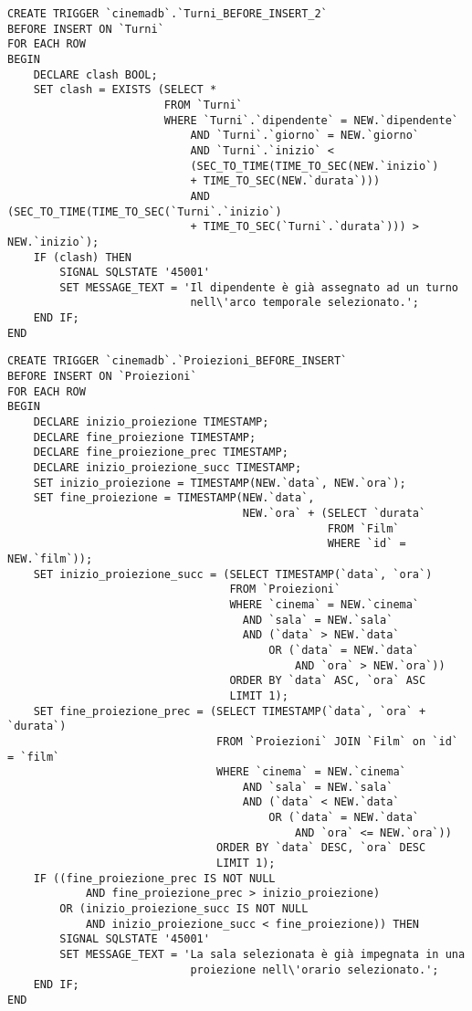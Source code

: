 \begin{verbatim}
CREATE TRIGGER `cinemadb`.`Turni_BEFORE_INSERT_2`
BEFORE INSERT ON `Turni`
FOR EACH ROW
BEGIN
    DECLARE clash BOOL;
    SET clash = EXISTS (SELECT * 
                        FROM `Turni` 
                        WHERE `Turni`.`dipendente` = NEW.`dipendente`
                            AND `Turni`.`giorno` = NEW.`giorno`
                            AND `Turni`.`inizio` < 
                            (SEC_TO_TIME(TIME_TO_SEC(NEW.`inizio`) 
                            + TIME_TO_SEC(NEW.`durata`))) 
                            AND (SEC_TO_TIME(TIME_TO_SEC(`Turni`.`inizio`) 
                            + TIME_TO_SEC(`Turni`.`durata`))) > NEW.`inizio`);
    IF (clash) THEN
        SIGNAL SQLSTATE '45001'
        SET MESSAGE_TEXT = 'Il dipendente è già assegnato ad un turno
                            nell\'arco temporale selezionato.';
    END IF;
END
\end{verbatim}

\pagebreak
\begin{verbatim}
CREATE TRIGGER `cinemadb`.`Proiezioni_BEFORE_INSERT`
BEFORE INSERT ON `Proiezioni`
FOR EACH ROW
BEGIN
    DECLARE inizio_proiezione TIMESTAMP;
    DECLARE fine_proiezione TIMESTAMP;
    DECLARE fine_proiezione_prec TIMESTAMP;
    DECLARE inizio_proiezione_succ TIMESTAMP;
    SET inizio_proiezione = TIMESTAMP(NEW.`data`, NEW.`ora`);
    SET fine_proiezione = TIMESTAMP(NEW.`data`,
                                    NEW.`ora` + (SELECT `durata`
                                                 FROM `Film`
                                                 WHERE `id` = NEW.`film`));
    SET inizio_proiezione_succ = (SELECT TIMESTAMP(`data`, `ora`)
                                  FROM `Proiezioni`
                                  WHERE `cinema` = NEW.`cinema`
                                    AND `sala` = NEW.`sala`
                                    AND (`data` > NEW.`data`
                                        OR (`data` = NEW.`data`
                                            AND `ora` > NEW.`ora`))
                                  ORDER BY `data` ASC, `ora` ASC
                                  LIMIT 1);
    SET fine_proiezione_prec = (SELECT TIMESTAMP(`data`, `ora` + `durata`)
                                FROM `Proiezioni` JOIN `Film` on `id` = `film`
                                WHERE `cinema` = NEW.`cinema`
                                    AND `sala` = NEW.`sala`
                                    AND (`data` < NEW.`data`
                                        OR (`data` = NEW.`data`
                                            AND `ora` <= NEW.`ora`))
                                ORDER BY `data` DESC, `ora` DESC
                                LIMIT 1);
    IF ((fine_proiezione_prec IS NOT NULL
            AND fine_proiezione_prec > inizio_proiezione)
        OR (inizio_proiezione_succ IS NOT NULL
            AND inizio_proiezione_succ < fine_proiezione)) THEN
        SIGNAL SQLSTATE '45001'
        SET MESSAGE_TEXT = 'La sala selezionata è già impegnata in una
                            proiezione nell\'orario selezionato.';
    END IF;
END
\end{verbatim}

